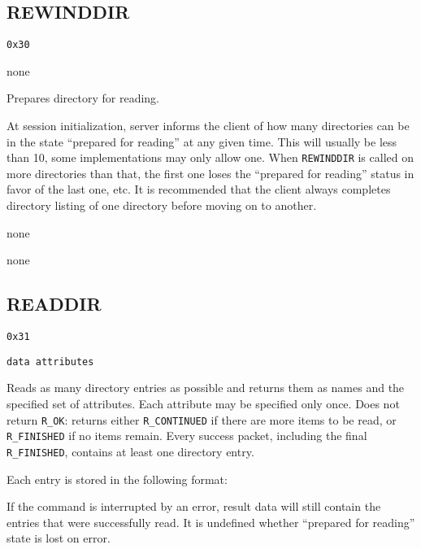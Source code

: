\subsection{REWINDDIR}

\begin{description}[noitemsep,topsep=1pt]
	\item[Code:] {\tt 0x30}
	\item[Arguments:] none
\end{description}

Prepares directory for reading.

At session initialization, server informs the client of how many directories can be in the state ``prepared
for reading'' at any given time. This will usually be less than 10, some implementations may only allow one.
When {\tt REWINDDIR} is called on more directories than that, the first one loses the ``prepared for reading''
status in favor of the last one, etc. It is recommended that the client always completes directory listing of
one directory before moving on to another.

\begin{description}[noitemsep,topsep=1pt]
	\item[Result data:] none
	\item[Specific errors:] none
\end{description}

\subsection{READDIR}

\begin{description}[noitemsep,topsep=1pt]
	\item[Code:] {\tt 0x31}
	\item[Arguments:] {\tt data attributes}
\end{description}

Reads as many directory entries as possible and returns them as names and the specified set of attributes.
Each attribute may be specified only once. Does not return {\tt R\_OK}: returns either {\tt R\_CONTINUED} if
there are more items to be read, or {\tt R\_FINISHED} if no items remain. Every success packet, including the
final {\tt R\_FINISHED}, contains at least one directory entry.

Each entry is stored in the following format:
\beginpk
\endpk

If the command is interrupted by an error, result data will still contain the entries that were successfully
read. It is undefined whether ``prepared for reading'' state is lost on error.


